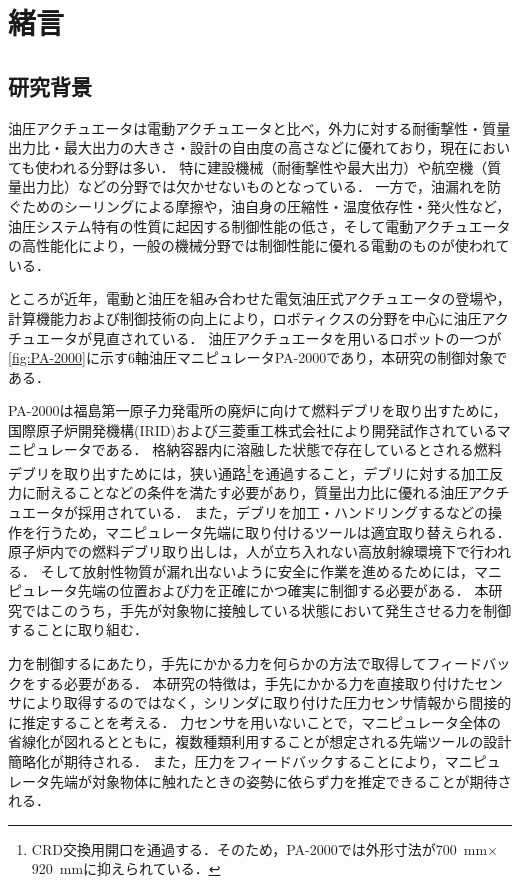 \chapter{緒言}

\section{研究背景}
油圧アクチュエータは電動アクチュエータと比べ，外力に対する耐衝撃性・質量出力比・最大出力の大きさ・設計の自由度の高さなどに優れており，現在においても使われる分野は多い．
特に建設機械（耐衝撃性や最大出力）や航空機（質量出力比）などの分野では欠かせないものとなっている．
一方で，油漏れを防ぐためのシーリングによる摩擦や，油自身の圧縮性・温度依存性・発火性など，油圧システム特有の性質に起因する制御性能の低さ，そして電動アクチュエータの高性能化により，一般の機械分野では制御性能に優れる電動のものが使われている．

ところが近年，電動と油圧を組み合わせた電気油圧式アクチュエータの登場や，計算機能力および制御技術の向上により，ロボティクスの分野を中心に油圧アクチュエータが見直されている\cite{feng2014optimization,kuindersma2016optimization,玄相昊2015招待講演}．
油圧アクチュエータを用いるロボットの一つが\figname\ref{fig:PA-2000}に示す6軸油圧マニピュレータPA-2000\cite{IRID}であり，本研究の制御対象である．

PA-2000は福島第一原子力発電所の廃炉に向けて燃料デブリを取り出すために，国際原子炉開発機構(IRID)および三菱重工株式会社により開発試作されているマニピュレータである\cite{河西賢一2018福島第一原子力発電所燃料デブリ横取り出しに向けたロボット開発}．
格納容器内に溶融した状態で存在しているとされる燃料デブリを取り出すためには，狭い通路\footnote{CRD交換用開口を通過する．そのため，PA-2000では外形寸法が\SI{700}{mm}$\times$\SI{920}{mm}に抑えられている．}を通過すること，デブリに対する加工反力に耐えることなどの条件を満たす必要があり，質量出力比に優れる油圧アクチュエータが採用されている．
また，デブリを加工・ハンドリングするなどの操作を行うため，マニピュレータ先端に取り付けるツールは適宜取り替えられる．
原子炉内での燃料デブリ取り出しは，人が立ち入れない高放射線環境下で行われる．
そして放射性物質が漏れ出ないように安全に作業を進めるためには，マニピュレータ先端の位置および力を正確にかつ確実に制御する必要がある．
本研究ではこのうち，手先が対象物に接触している状態において発生させる力を制御することに取り組む．

力を制御するにあたり，手先にかかる力を何らかの方法で取得してフィードバックをする必要がある．
本研究の特徴は，手先にかかる力を直接取り付けたセンサにより取得するのではなく，シリンダに取り付けた圧力センサ情報から間接的に推定することを考える．
力センサを用いないことで，マニピュレータ全体の省線化が図れるとともに，複数種類利用することが想定される先端ツールの設計簡略化が期待される．
また，圧力をフィードバックすることにより，マニピュレータ先端が対象物体に触れたときの姿勢に依らず力を推定できることが期待される．

